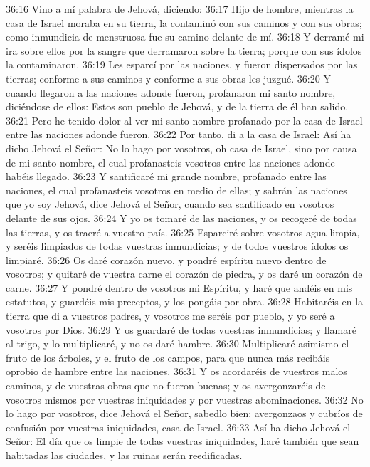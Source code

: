 36:16 Vino a mí palabra de Jehová, diciendo:  
36:17 Hijo de hombre, mientras la casa de Israel moraba en su tierra, la contaminó con sus caminos y con sus obras; como inmundicia de menstruosa fue su camino delante de mí.  
36:18 Y derramé mi ira sobre ellos por la sangre que derramaron sobre la tierra; porque con sus ídolos la contaminaron.  
36:19 Les esparcí por las naciones, y fueron dispersados por las tierras; conforme a sus caminos y conforme a sus obras les juzgué.  
36:20 Y cuando llegaron a las naciones adonde fueron, profanaron mi santo nombre, diciéndose de ellos: Estos son pueblo de Jehová, y de la tierra de él han salido.  
36:21 Pero he tenido dolor al ver mi santo nombre profanado por la casa de Israel entre las naciones adonde fueron.  
36:22 Por tanto, di a la casa de Israel: Así ha dicho Jehová el Señor: No lo hago por vosotros, oh casa de Israel, sino por causa de mi santo nombre, el cual profanasteis vosotros entre las naciones adonde habéis llegado.  
36:23 Y santificaré mi grande nombre, profanado entre las naciones, el cual profanasteis vosotros en medio de ellas; y sabrán las naciones que yo soy Jehová, dice Jehová el Señor, cuando sea santificado en vosotros delante de sus ojos.  
36:24 Y yo os tomaré de las naciones, y os recogeré de todas las tierras, y os traeré a vuestro país.  
36:25 Esparciré sobre vosotros agua limpia, y seréis limpiados de todas vuestras inmundicias; y de todos vuestros ídolos os limpiaré.  
36:26 Os daré corazón nuevo, y pondré espíritu nuevo dentro de vosotros; y quitaré de vuestra carne el corazón de piedra, y os daré un corazón de carne.  
36:27 Y pondré dentro de vosotros mi Espíritu, y haré que andéis en mis estatutos, y guardéis mis preceptos, y los pongáis por obra.  
36:28 Habitaréis en la tierra que di a vuestros padres, y vosotros me seréis por pueblo, y yo seré a vosotros por Dios. 
36:29 Y os guardaré de todas vuestras inmundicias; y llamaré al trigo, y lo multiplicaré, y no os daré hambre.  
36:30 Multiplicaré asimismo el fruto de los árboles, y el fruto de los campos, para que nunca más recibáis oprobio de hambre entre las naciones.  
36:31 Y os acordaréis de vuestros malos caminos, y de vuestras obras que no fueron buenas; y os avergonzaréis de vosotros mismos por vuestras iniquidades y por vuestras abominaciones.  
36:32 No lo hago por vosotros, dice Jehová el Señor, sabedlo bien; avergonzaos y cubríos de confusión por vuestras iniquidades, casa de Israel.  
36:33 Así ha dicho Jehová el Señor: El día que os limpie de todas vuestras iniquidades, haré también que sean habitadas las ciudades, y las ruinas serán reedificadas.  
